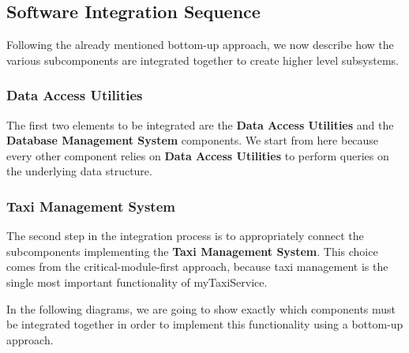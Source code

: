 \subsection{Software Integration Sequence}
Following the already mentioned bottom-up approach, we now describe how the various subcomponents are integrated together to create higher level subsystems. 
\subsubsection*{Data Access Utilities}
The first two elements to be integrated are the \textbf{Data Access Utilities} and the \textbf{Database Management System} components. We start from here because every other component relies on \textbf{Data Access Utilities} to perform queries on the underlying data structure. 
\begin{figure}[H]
\centering
{}
\end{figure}
\subsubsection*{Taxi Management System}
The second step in the integration process is to appropriately connect the subcomponents implementing the \textbf{Taxi Management System}. This choice comes from the critical-module-first approach, because taxi management is the single most important functionality of myTaxiService.

In the following diagrams, we are going to show exactly which components must be integrated together in order to implement this functionality using a bottom-up approach.

